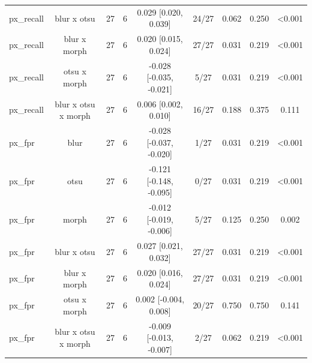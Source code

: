 \begin{table}[t]
\begin{tabular}{lcccccccc}
px\_recall & blur x otsu & 27 & 6 & 0.029 [0.020, 0.039] & 24/27 & 0.062 & 0.250 & <0.001 \\
px\_recall & blur x morph & 27 & 6 & 0.020 [0.015, 0.024] & 27/27 & 0.031 & 0.219 & <0.001 \\
px\_recall & otsu x morph & 27 & 6 & -0.028 [-0.035, -0.021] & 5/27 & 0.031 & 0.219 & <0.001 \\
px\_recall & blur x otsu x morph & 27 & 6 & 0.006 [0.002, 0.010] & 16/27 & 0.188 & 0.375 & 0.111 \\
px\_fpr & blur & 27 & 6 & -0.028 [-0.037, -0.020] & 1/27 & 0.031 & 0.219 & <0.001 \\
px\_fpr & otsu & 27 & 6 & -0.121 [-0.148, -0.095] & 0/27 & 0.031 & 0.219 & <0.001 \\
px\_fpr & morph & 27 & 6 & -0.012 [-0.019, -0.006] & 5/27 & 0.125 & 0.250 & 0.002 \\
px\_fpr & blur x otsu & 27 & 6 & 0.027 [0.021, 0.032] & 27/27 & 0.031 & 0.219 & <0.001 \\
px\_fpr & blur x morph & 27 & 6 & 0.020 [0.016, 0.024] & 27/27 & 0.031 & 0.219 & <0.001 \\
px\_fpr & otsu x morph & 27 & 6 & 0.002 [-0.004, 0.008] & 20/27 & 0.750 & 0.750 & 0.141 \\
px\_fpr & blur x otsu x morph & 27 & 6 & -0.009 [-0.013, -0.007] & 2/27 & 0.062 & 0.219 & <0.001 \\
\bottomrule
\end{tabular}
\end{table}
